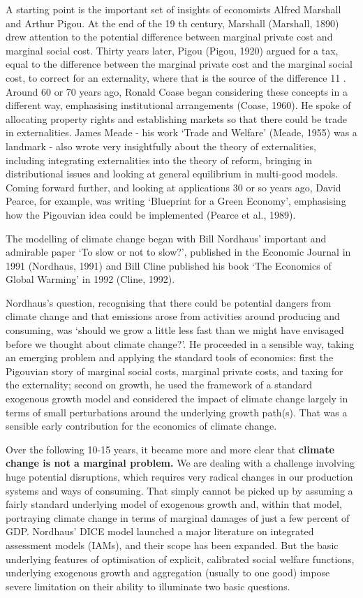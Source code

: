 \documentclass[
]{book}
\begin{document}
A starting point is the important set of insights of economists Alfred Marshall and Arthur Pigou.
At the end of the 19 th century, Marshall (Marshall, 1890) drew attention to the potential difference
between marginal private cost and marginal social cost. Thirty years later, Pigou (Pigou, 1920) argued
for a tax, equal to the difference between the marginal private cost and the marginal social cost, to
correct for an externality, where that is the source of the difference 11 .
Around 60 or 70 years ago, Ronald Coase began considering these concepts in a different way,
emphasising institutional arrangements (Coase, 1960). He spoke of allocating property rights and
establishing markets so that there could be trade in externalities. James Meade - his work `Trade and
Welfare' (Meade, 1955) was a landmark - also wrote very insightfully about the theory of externalities,
including integrating externalities into the theory of reform, bringing in distributional issues and looking
at general equilibrium in multi-good models. Coming forward further, and looking at applications 30 or
so years ago, David Pearce, for example, was writing `Blueprint for a Green Economy', emphasising
how the Pigouvian idea could be implemented (Pearce et al., 1989).

The modelling of climate change
began with Bill Nordhaus' important and admirable paper `To slow or not to slow?', published in the
Economic Journal in 1991 (Nordhaus, 1991) and Bill Cline published his book `The Economics of Global Warming' in 1992 (Cline, 1992).

Nordhaus's question, recognising that there could be potential dangers
from climate change and that emissions arose from activities around producing and consuming, was
`should we grow a little less fast than we might have envisaged before we thought about climate
change?'. He proceeded in a sensible way, taking an emerging problem and applying the standard tools
of economics: first the Pigouvian story of marginal social costs, marginal private costs, and taxing for
the externality; second on growth, he used the framework of a standard exogenous growth model and
considered the impact of climate change largely in terms of small perturbations around the underlying
growth path(s). That was a sensible early contribution for the economics of climate change.

Over the following 10-15 years, it became more and more clear that
\textbf{climate change is not a marginal problem.}
We are dealing with a challenge involving huge potential disruptions, which requires very
radical changes in our production systems and ways of consuming. That simply cannot be picked up
by assuming a fairly standard underlying model of exogenous growth and, within that model, portraying
climate change in terms of marginal damages of just a few percent of GDP. Nordhaus' DICE model
launched a major literature on integrated assessment models (IAMs), and their scope has been
expanded. But the basic underlying features of optimisation of explicit, calibrated social welfare
functions, underlying exogenous growth and aggregation (usually to one good) impose severe limitation
on their ability to illuminate two basic questions.
\end{document}
